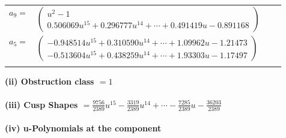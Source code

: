 \documentclass[1p]{elsarticle_modified}
\theoremstyle{definition}
\begin{document}
\begin{tabular}{m{7pt} m{180pt} m{7pt} m{180pt} }
\flushright $a_{9}=$&$\begin{pmatrix}u^2-1\\0.506069 u^{15}+0.296777 u^{14}+\cdots+0.491419 u-0.891168\end{pmatrix}$ \\
\flushright $a_{5}=$&$\begin{pmatrix}-0.948514 u^{15}+0.310590 u^{14}+\cdots+1.09962 u-1.21473\\-0.513604 u^{15}+0.438259 u^{14}+\cdots+1.93303 u-1.17497\end{pmatrix}$\\&\end{tabular}
\flushleft \textbf{(ii) Obstruction class $= 1$}\\~\\
\flushleft \textbf{(iii) Cusp Shapes $= \frac{9756}{2389} u^{15}-\frac{3319}{2389} u^{14}+\cdots-\frac{7285}{2389} u-\frac{36203}{2389}$}\\~\\
\newpage\renewcommand{\arraystretch}{1}
\flushleft \textbf{(iv) u-Polynomials at the component}\newline \\
\end{document}
